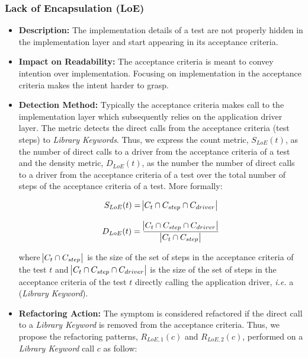 \subsubsection{Lack of Encapsulation (LoE)}

\begin{itemize}
    \item \textbf{Description:} The implementation details of a test are not properly hidden in the implementation layer and start appearing in its acceptance criteria.

    \item \textbf{Impact on Readability:} The acceptance criteria is meant to convey intention over implementation. Focusing on implementation in the acceptance criteria makes the intent harder to grasp.
    
    \item \textbf{Detection Method:} Typically the acceptance criteria makes call to the implementation layer which subsequently relies on the application driver layer. The metric detects the direct calls from the acceptance criteria (test steps) to \emph{Library Keywords}. Thus, we express the count metric, $S_{LoE}(t)$, as the number of direct calls to a driver from the acceptance criteria of a test and the density metric, $D_{LoE}(t)$, as the number the number of direct calls to a driver from the acceptance criteria of a test over the total number of steps of the acceptance criteria of a test. More formally:
    
    \begin{equation*}
        S_{LoE}(t) = \abs{C_{t} \cap C_{step} \cap C_{driver}}
    \end{equation*}
    
    \begin{equation*}
        D_{LoE}(t) = \frac{\abs{C_{t} \cap C_{step} \cap C_{driver}}}{\abs{C_{t} \cap C_{step}}}
    \end{equation*}
    
    where $\abs{C_{t} \cap C_{step}}$ is the size of the set of steps in the acceptance criteria of the test $t$ and $\abs{C_{t} \cap C_{step} \cap C_{driver}}$ is the size of the set of steps in the acceptance criteria of the test $t$ directly calling the application driver, \emph{i.e.} a (\emph{Library Keyword}).
    
    \item \textbf{Refactoring Action:} The symptom is considered refactored if the direct call to a \emph{Library Keyword} is removed from the acceptance criteria. Thus, we propose the refactoring patterns, $R_{LoE, 1}(c)$ and $R_{LoE, 2}(c)$, performed on a \emph{Library Keyword} call $c$ as follow:


\end{itemize}
